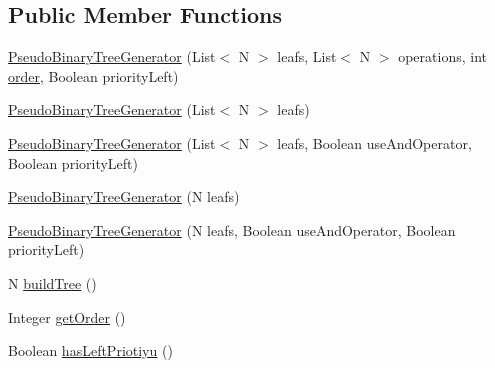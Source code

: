 \subsection*{Public Member Functions}
\begin{DoxyCompactItemize}
\item 
\hyperlink{classit_1_1emarolab_1_1cagg_1_1core_1_1PseudoBinaryNode_1_1PseudoBinaryTreeGenerator_3_01N_01extends_01PseudoBinaryNode_01_4_a805b29f67315b755c6065a03a40508e8}{Pseudo\-Binary\-Tree\-Generator} (List$<$ N $>$ leafs, List$<$ N $>$ operations, int \hyperlink{classit_1_1emarolab_1_1cagg_1_1core_1_1PseudoBinaryNode_1_1PseudoBinaryTreeGenerator_3_01N_01extends_01PseudoBinaryNode_01_4_a30f909e3ad1783efcad6a4e673d9bfd8}{order}, Boolean priority\-Left)
\item 
\hyperlink{classit_1_1emarolab_1_1cagg_1_1core_1_1PseudoBinaryNode_1_1PseudoBinaryTreeGenerator_3_01N_01extends_01PseudoBinaryNode_01_4_a0d40bc5efb2a8b85c869b0769459db54}{Pseudo\-Binary\-Tree\-Generator} (List$<$ N $>$ leafs)
\item 
\hyperlink{classit_1_1emarolab_1_1cagg_1_1core_1_1PseudoBinaryNode_1_1PseudoBinaryTreeGenerator_3_01N_01extends_01PseudoBinaryNode_01_4_a05bfa70149b21bda56f1fd87ba1dcbfd}{Pseudo\-Binary\-Tree\-Generator} (List$<$ N $>$ leafs, Boolean use\-And\-Operator, Boolean priority\-Left)
\item 
\hyperlink{classit_1_1emarolab_1_1cagg_1_1core_1_1PseudoBinaryNode_1_1PseudoBinaryTreeGenerator_3_01N_01extends_01PseudoBinaryNode_01_4_a7f3bd6da30cbf6af4ba5510ce8d498d1}{Pseudo\-Binary\-Tree\-Generator} (N leafs)
\item 
\hyperlink{classit_1_1emarolab_1_1cagg_1_1core_1_1PseudoBinaryNode_1_1PseudoBinaryTreeGenerator_3_01N_01extends_01PseudoBinaryNode_01_4_a3938f9610aa017828c8993fb88c15a24}{Pseudo\-Binary\-Tree\-Generator} (N leafs, Boolean use\-And\-Operator, Boolean priority\-Left)
\item 
N \hyperlink{classit_1_1emarolab_1_1cagg_1_1core_1_1PseudoBinaryNode_1_1PseudoBinaryTreeGenerator_3_01N_01extends_01PseudoBinaryNode_01_4_afff985541ca89731a0467ab5435f843b}{build\-Tree} ()
\item 
Integer \hyperlink{classit_1_1emarolab_1_1cagg_1_1core_1_1PseudoBinaryNode_1_1PseudoBinaryTreeGenerator_3_01N_01extends_01PseudoBinaryNode_01_4_a99060fa2f6a7b60566a62acf61875fac}{get\-Order} ()
\item 
Boolean \hyperlink{classit_1_1emarolab_1_1cagg_1_1core_1_1PseudoBinaryNode_1_1PseudoBinaryTreeGenerator_3_01N_01extends_01PseudoBinaryNode_01_4_aa520aaf8e03e5d6e58093297b887e0a7}{has\-Left\-Priotiyu} ()

\end{DoxyCompactItemize}
